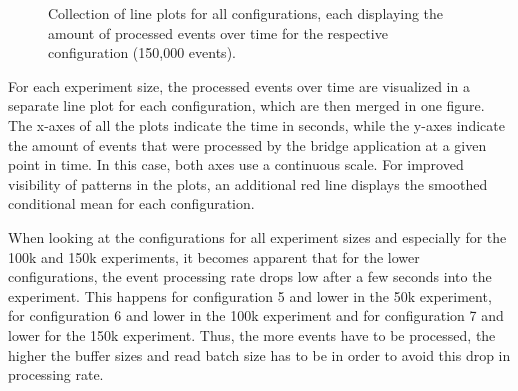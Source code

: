 \begin{figure}[h]
        \caption{Collection of line plots for all configurations, each displaying the amount of processed events over time for the respective configuration (150,000 events).}
        \label{fig:evaluation:performance:config-comparison_150k}
\end{figure}

For each experiment size, the processed events over time are visualized in a separate line plot for each configuration, which are then merged in one figure.
The x-axes of all the plots indicate the time in seconds, while the y-axes indicate the amount of events that were processed by the bridge application at a given point in time.
In this case, both axes use a continuous scale.
For improved visibility of patterns in the plots, an additional red line displays the smoothed conditional mean for each configuration.

When looking at the configurations for all experiment sizes and especially for the 100k and 150k experiments, it becomes apparent that for the lower configurations, the event processing rate drops low after a few seconds into the experiment.
This happens for configuration 5 and lower in the 50k experiment, for configuration 6 and lower in the 100k experiment and for configuration 7 and lower for the 150k experiment.
Thus, the more events have to be processed, the higher the buffer sizes and read batch size has to be in order to avoid this drop in processing rate.

